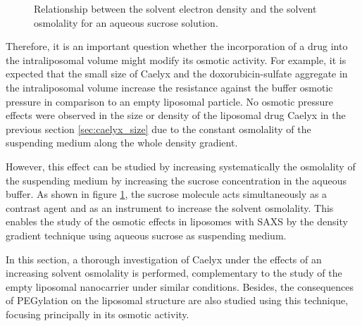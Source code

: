 \begin{figure}
	\centering
		{\resizebox{0.8\linewidth}{!}{\figfont{12pt}}}
		\caption[Relationship between the solvent electron density and the solvent osmolality for an aqueous sucrose solution.]{Relationship between the solvent electron density and the solvent osmolality for an aqueous sucrose solution.}
		\label{fig:OsmolalityElectronDensity}
\end{figure}

Therefore, it is an important question whether the incorporation of a drug into the intraliposomal volume might modify its osmotic activity. For example, it is expected that the small size of Caelyx and the doxorubicin-sulfate aggregate in the intraliposomal volume increase the resistance against the buffer osmotic pressure in comparison to an empty liposomal particle.  No osmotic pressure effects were observed in the size or density of the liposomal drug Caelyx in the previous section \ref{sec:caelyx_size} due to the constant osmolality of the suspending medium along the whole density gradient.

However, this effect can be studied by increasing systematically the osmolality of the suspending medium by increasing the sucrose concentration in the aqueous buffer. As shown in figure \ref{fig:OsmolalityElectronDensity}, the sucrose molecule acts simultaneously as a contrast agent and as an instrument to increase the solvent osmolality. This enables the study of the osmotic effects in liposomes with SAXS by the density gradient technique using aqueous sucrose as suspending medium. 

In this section, a thorough investigation of Caelyx under the effects of an increasing solvent osmolality is performed, complementary to the study of the empty liposomal nanocarrier under similar conditions. Besides, the consequences of PEGylation on the liposomal structure are also studied using this technique, focusing principally in its osmotic activity. 


